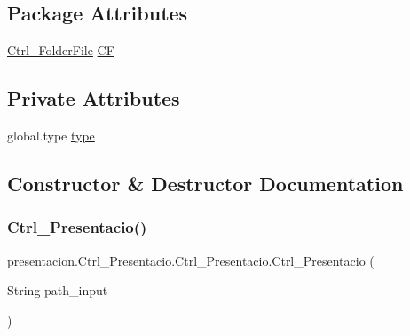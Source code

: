 \subsection*{Package Attributes}
\begin{DoxyCompactItemize}
\item 
\hyperlink{classdomini_1_1folders_1_1Ctrl__FolderFile}{Ctrl\+\_\+\+Folder\+File} \hyperlink{classpresentacion_1_1Ctrl__Presentacio_1_1Ctrl__Presentacio_af46ef2ef420276ff830c2f0ff8c1a7e6}{CF}
\end{DoxyCompactItemize}
\subsection*{Private Attributes}
\begin{DoxyCompactItemize}
\item 
global.\+type \hyperlink{classpresentacion_1_1Ctrl__Presentacio_1_1Ctrl__Presentacio_af72267ee1302df6b5982c3248d5a19b0}{type}
\end{DoxyCompactItemize}


\subsection{Constructor \& Destructor Documentation}
\mbox{\label{classpresentacion_1_1Ctrl__Presentacio_1_1Ctrl__Presentacio_a3d3ac2a3c4b9fa715bb631fdf3a955dd}} 
\subsubsection{\texorpdfstring{Ctrl\+\_\+\+Presentacio()}{Ctrl\_Presentacio()}}
{\footnotesize\ttfamily presentacion.\+Ctrl\+\_\+\+Presentacio.\+Ctrl\+\_\+\+Presentacio.\+Ctrl\+\_\+\+Presentacio (\begin{DoxyParamCaption}\item[{String}]{path\+\_\+input }\end{DoxyParamCaption})\hspace{0.3cm}{\ttfamily [inline]}}



